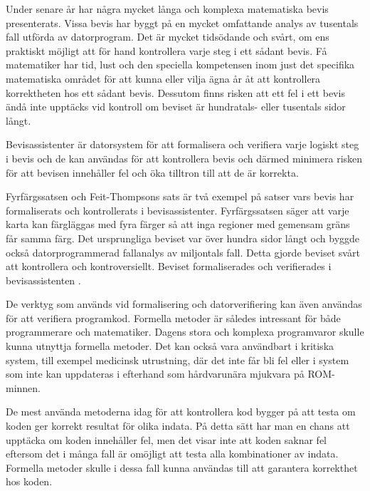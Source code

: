 Under senare år har några mycket långa och komplexa matematiska bevis
presenterats. Vissa bevis har byggt på en mycket omfattande analys av
tusentals fall utförda av datorprogram. Det är mycket tidsödande och svårt, om
ens praktiskt möjligt att för hand kontrollera varje steg i ett sådant bevis. Få
matematiker har tid, lust och den speciella kompetensen inom just det specifika
matematiska området för att kunna eller vilja ägna år åt att
kontrollera korrektheten hos ett sådant bevis. Dessutom finns risken att ett
fel i ett bevis ändå inte upptäcks vid kontroll om beviset är hundratals- eller
tusentals sidor långt\cite{harrison2008formal}.

Bevisassistenter är datorsystem för att formalisera och verifiera varje logiskt
steg i bevis och de kan användas för att kontrollera bevis och därmed minimera
risken för att bevisen innehåller fel och öka tilltron till att de är korrekta.

Fyrfärgssatsen\cite{gonthier2008formal} och Feit-Thompsons
sats\cite{aschbacher2004status} är två exempel på satser vars bevis har
formaliserats och kontrollerats i bevisassistenter. Fyrfärgssatsen säger att
varje karta kan färgläggas med fyra färger så att inga regioner med gemensam
gräns får samma färg. Det ursprungliga beviset var över hundra sidor långt och
byggde också datorprogrammerad fallanalys av miljontals fall. Detta gjorde
beviset svårt att kontrollera och kontroversiellt. Beviset formaliserades och
verifierades i bevisassistenten .

De verktyg som används vid formalisering och datorverifiering kan även användas
för att verifiera programkod. Formella metoder är således intressant för både
programmerare och matematiker.
Dagens stora och komplexa programvaror skulle kunna utnyttja formella metoder.
Det kan också vara användbart i kritiska system, till exempel medicinsk
utrustning, där det inte får bli fel eller i system som inte kan uppdateras i
efterhand som hårdvarunära mjukvara på ROM-minnen.

De mest använda metoderna idag för att kontrollera kod bygger på att testa om
koden ger korrekt resultat för olika indata. På detta sätt har man en chans att
upptäcka om koden innehåller fel, men det visar inte att koden saknar fel
eftersom det i många fall är omöjligt att testa alla kombinationer av indata.
Formella metoder skulle i dessa fall kunna användas till att garantera
korrekthet hos koden.

